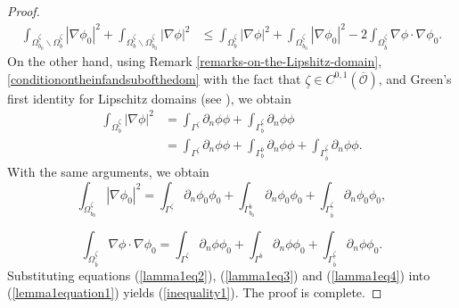 \documentclass[11pt]{article}
\begin{document}
\begin{proof}
	\begin{equation}\label{lemma1equation1}
		\begin{split}
			\displaystyle\int_{\Omega_{b_0}^{\underline{\zeta}}\backslash \Omega_{b}^{\underline{\zeta}}}\left|\nabla\phi_0\right|^2+\displaystyle\int_{\Omega_{b}^{\underline{\zeta}}\backslash \Omega_{b_0}^{\underline{\zeta}}}\left|\nabla\phi\right|^2&\leq
			\displaystyle\int_{\Omega_{b}^{  \underline{\zeta}  }}\left| \nabla\phi\right|^2+\displaystyle\int_{\Omega_{b_0}^{  \underline{\zeta}  }}\left| \nabla\phi_0\right|^2-2\displaystyle\int_{\Omega_{\overline{b}}^{\underline{\zeta}}}\nabla\phi\cdot\nabla\phi_0.
		\end{split}
	\end{equation}
	On the other hand,  using Remark \ref{remarks-on-the-Lipshitz-domain},  \eqref{conditionontheinfandsubofthedom} with the fact that $\underline\zeta \in C^{0,1}(\overline{\mathcal O })$, and Green's first identity for Lipschitz domains (see \cite{grisvard2011elliptic,necas2011direct}), we obtain
	\begin{equation}\label{lamma1eq2}
		\begin{split}
			\displaystyle\int_{\Omega_{b}^{  \underline{\zeta}  }}\left| \nabla\phi\right|^2&=\displaystyle\int_{\Gamma^{\underline{\zeta}}} \partial_n\phi \phi +\displaystyle\int_{\Gamma_{b}^{\underline{\zeta}}} \partial_n\phi \phi \\
			&=\displaystyle\int_{\Gamma^{\underline{\zeta}}} \partial_n\phi \phi +\displaystyle\int_{\Gamma_{b}^{\overline{b}}} \partial_n\phi \phi+\displaystyle\int_{\Gamma_{\overline{b}}^{\underline{\zeta}}} \partial_n\phi \phi.
		\end{split}
	\end{equation}
	With the same arguments, we obtain
	\begin{equation}\label{lamma1eq3}
		\displaystyle\int_{\Omega_{b_0}^{  \underline{\zeta}  }}\left| \nabla\phi_0\right|^2=\displaystyle\int_{\Gamma^{\underline{\zeta}}} \partial_n\phi_0 \phi_0 +\displaystyle\int_{\Gamma_{b_0}^{\overline{b}}} \partial_n\phi_0 \phi_0+\displaystyle\int_{\Gamma_{\overline{b}}^{\underline{\zeta}}} \partial_n\phi_0 \phi_0,
	\end{equation}
	
	\begin{equation}\label{lamma1eq4}
		\displaystyle\int_{\Omega_{\overline{b}}^{  \underline{\zeta}  }}\nabla\phi\cdot\nabla\phi_0=\displaystyle\int_{\Gamma^{\underline{\zeta}}} \partial_n\phi \phi_0 +\displaystyle\int_{\Gamma^{\overline{b}}} \partial_n\phi \phi_0+\displaystyle\int_{\Gamma_{\overline{b}}^{\underline{\zeta}}} \partial_n\phi \phi_0.
	\end{equation}
	Substituting equations (\ref{lamma1eq2}), (\ref{lamma1eq3}) and (\ref{lamma1eq4}) into (\ref{lemma1equation1}) 
	yields (\ref{inequality1}). The proof is complete.
\end{proof}
\end{document}
